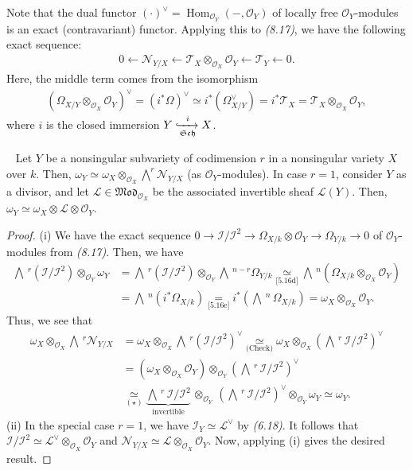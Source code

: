 \documentclass[11pt,a4paper,footinclude=true,headinclude=true]{scrbook} %
\DeclareMathOperator{\Hom}{Hom}
\newcommand{\II}{\mathscr{I}}
\newcommand{\LL}{\mathscr{L}}
\newcommand{\NN}{\mathcal{N}}
\newcommand{\OO}{\mathcal{O}}
\newcommand{\TT}{\mathcal{T}}
\newcommand{\Sch}{\mathfrak{Sch}}
\newcommand{\<}{\langle}
\newcommand{\>}{\rangle}
\newcommand{\MOD}{\mathfrak{Mod}}
\newenvironment{proposition}[2][]
{\renewcommand\theinnercustomprop{#2}\innercustomprop[#1] 
\begin{mdframed}[backgroundcolor=gray!20]\ }
{\end{mdframed}\endinnercustomprop}
\newenvironment{remark*}[2][Remark]
    { \begin{mdframed}[backgroundcolor=gray!20] \textbf{#1.}\ }
    {  \end{mdframed}}
\begin{document}
\begin{remark*}{}
    Note that the dual functor $(\cdot)^\vee=\Hom_{\OO_Y}(-,\OO_Y)$ of locally free $\OO_Y$-modules is an exact (contravariant) functor. Applying this to \textit{(8.17)}, we have the following exact sequence:
    \begin{align*}
        0\longleftarrow\NN_{Y/X}\longleftarrow\TT_X\otimes_{\OO_X}\OO_Y\longleftarrow\TT_Y\longleftarrow0.
    \end{align*}
    Here, the middle term comes from the isomorphism
    \begin{align*}
        (\Omega_{X/Y}\otimes_{\OO_X}\OO_Y)^\vee=(i^\ast\Omega)^\vee\simeq i^\ast(\Omega_{X/Y}^\vee)=i^\ast\TT_X=\TT_X\otimes_{\OO_X}\OO_Y,
    \end{align*}
    where $i$ is the closed immersion $Y\xhookrightarrow[\Sch]{i}X$.
\end{remark*}

\begin{proposition}{8.20}
    Let $Y$ be a nonsingular subvariety of codimension $r$ in a nonsingular variety $X$ over $k$. Then, $\omega_Y\simeq\omega_X\otimes_{\OO_X}\bigwedge^r\NN_{Y/X}$ (as $\OO_Y$-modules). In case $r=1$, consider $Y$ as a divisor, and let $\LL\in\MOD_{\OO_X}$ be the associated invertible sheaf $\LL(Y)$. Then, $\omega_Y\simeq\omega_X\otimes\LL\otimes\OO_Y$.
\end{proposition}
\begin{proof}
    (i) We have the exact sequence $0\to\II/\II^2\to\Omega_{X/k}\otimes\OO_Y\to\Omega_{Y/k}\to0$ of $\OO_Y$-modules from \textit{(8.17)}. Then, we have
    \begin{align*}
        \bigwedge\,^r(\II/\II^2)\otimes_{\OO_Y}\omega_Y &=\bigwedge\,^r(\II/\II^2)\otimes_{\OO_Y}\bigwedge\,^{n-r}\Omega_{Y/k}\underset{\text{[5.16d]}}{\simeq}\bigwedge\,^n(\Omega_{X/k}\otimes_{\OO_X}\OO_Y)\\ &=\bigwedge\,^n(i^\ast\Omega_{X/k})\underset{\text{[5.16e]}}{=}i^\ast(\bigwedge\,^n\,\Omega_{X/k})=\omega_X\otimes_{\OO_X}\OO_Y. \tag{$\star$}
    \end{align*}
    Thus, we see that
    \begin{align*}
        \omega_X\otimes_{\OO_X}\bigwedge\,^r\NN_{Y/X} &=\omega_X\otimes_{\OO_X}\bigwedge\,^r(\II/\II^2)^\vee\underset{\text{(Check)}}{\simeq}\omega_X\otimes_{\OO_X}(\bigwedge\,^r\,\II/\II^2)^\vee\\ &=(\omega_X\otimes_{\OO_X}\OO_Y)\otimes_{\OO_Y}(\bigwedge\,^r\,\II/\II^2)^\vee\\ &\underset{(\star)}{\simeq}\underbrace{\bigwedge\,^r\,\II/\II^2}_{\text{invertible}}\,\otimes_{\OO_Y}\,(\bigwedge\,^r\,\II/\II^2)^\vee\otimes_{\OO_Y}\omega_Y\simeq\omega_Y.
    \end{align*}
    (ii) In the special case $r=1$, we have $\II_Y\simeq\LL^\vee$ by \textit{(6.18)}. It follows that $\II/\II^2\simeq\LL^\vee\otimes_{\OO_X}\OO_Y$ and $\NN_{Y/X}\simeq\LL\otimes_{\OO_X}\OO_Y$. Now, applying (i) gives the desired result.
\end{proof}
\end{document}
